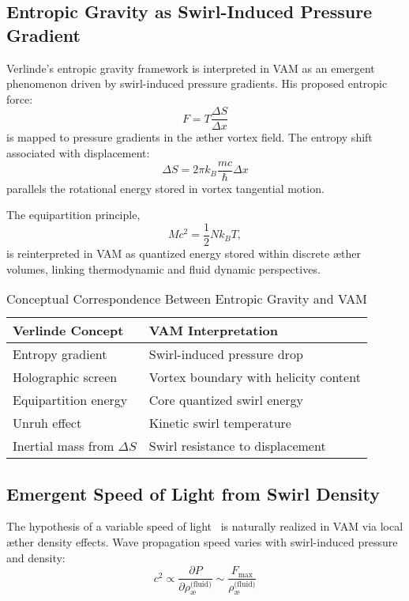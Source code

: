 \documentclass[12pt]{article}
\begin{document}
            \subsection{Entropic Gravity as Swirl-Induced Pressure Gradient}
            Verlinde's entropic gravity framework \cite{verlinde2010emergent} is interpreted in VAM as an emergent phenomenon driven by swirl-induced pressure gradients. His proposed entropic force:
            \[
                F = T \frac{\Delta S}{\Delta x}
            \]
            is mapped to pressure gradients in the æther vortex field. The entropy shift associated with displacement:
            \[
                \Delta S = 2\pi k_B \frac{mc}{\hbar} \Delta x
            \]
            parallels the rotational energy stored in vortex tangential motion.

            The equipartition principle,
            \[
                Mc^2 = \frac{1}{2} N k_B T,
            \]
            is reinterpreted in VAM as quantized energy stored within discrete æther volumes, linking thermodynamic and fluid dynamic perspectives.

            \begin{table}[H]
                \centering
                \footnotesize
                \caption{Conceptual Correspondence Between Entropic Gravity and VAM}
                \begin{tabular}{|l|l|}
                    \hline
                    \textbf{Verlinde Concept} & \textbf{VAM Interpretation} \\
                    \hline
                    Entropy gradient & Swirl-induced pressure drop \\
                    Holographic screen & Vortex boundary with helicity content \\
                    Equipartition energy & Core quantized swirl energy \\
                    Unruh effect & Kinetic swirl temperature \\
                    Inertial mass from $\Delta S$ & Swirl resistance to displacement \\
                    \hline
                \end{tabular}
            \end{table}

            \subsection*{Emergent Speed of Light from Swirl Density}
            The hypothesis of a variable speed of light~\cite{popescu2008cvar} is naturally realized in VAM via local æther density effects. Wave propagation speed varies with swirl-induced pressure and density:
            \[
                c^2 \propto \frac{\partial P}{\partial \rho_{\text{\ae}}^{\text{(fluid)}}} \sim \frac{F_\text{max}}{\rho_{\text{\ae}}^{\text{(fluid)}}}
            \]
\end{document}
